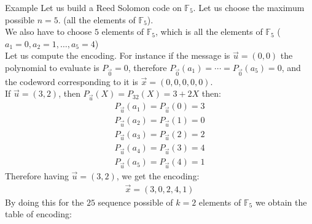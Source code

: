 \begin{parag}{Example}
    Let us build a Reed Solomon code on $\mathbb{F}_5$. Let us choose the maximum possible $n= 5$. (all the elements of $\mathbb{F}_5$).\\
    We also have to choose $5$ elements of $\mathbb{F}_5$, which is all the elements of $\mathbb{F}_5$ ($a_1 = 0, a_2 = 1, \ldots, a_5 = 4$)\\
    Let us compute the encoding. For instance if the message is $\vec{u} = \left(0, 0\right)$ the polynomial to evaluate is $P_{\vec{0}}= 0$, therefore $P_{\vec{0}}\left(a_1\right) =  \cdots = P_{\vec{0}}\left(a_5\right) = 0$, and the codeword corresponding to it is $\vec{x} = \left(0, 0, 0, 0, 0\right)$.\\
    If $\vec{u} =  \left(3, 2\right)$, then $P_{\vec{u}}\left(X\right) = P_{32}\left(X\right) = 3 + 2X$ then:
    \begin{align*} 
        P_{\vec{u}}\left(a_1\right) =  P_{\vec{u}}\left(0\right) = 3\\
        P_{\vec{u}}\left(a_2\right) =  P_{\vec{u}}\left(1\right) = 0\\
        P_{\vec{u}}\left(a_3\right) =  P_{\vec{u}}\left(2\right) = 2\\
        P_{\vec{u}}\left(a_4\right) =  P_{\vec{u}}\left(3\right) = 4\\
        P_{\vec{u}}\left(a_5\right) =  P_{\vec{u}}\left(4\right) = 1
    \end{align*}
    Therefore having $\vec{u} = \left(3, 2\right)$, we get the encoding:
    \begin{align*} 
        \vec{x} =  \left(3, 0, 2, 4, 1\right)
    \end{align*}
    By doing this for the $25$ sequence possible of $k = 2$ elements of $\mathbb{F}_5$ we obtain the table of encoding:

\end{parag}
